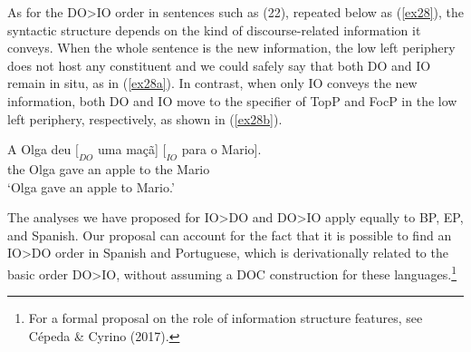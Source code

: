 \documentclass[output=paper,modfonts,nonflat]{langsci/langscibook}
\begin{document}

As for the DO>IO order in sentences such as (22), repeated below as (\ref{ex28}), the syntactic structure depends on the kind of discourse-related information it conveys. When the whole sentence is the new information, the low left periphery does not host any constituent and we could safely say that both DO and IO remain in situ, as in (\ref{ex28a}). In contrast, when only IO conveys the new information, both DO and IO move to the specifier of TopP and FocP in the low left periphery, respectively, as shown in (\ref{ex28b}).

\ea \label{ex28}
	\gll A   Olga deu $[_{DO}$ uma maçã] $[_{IO}$ para o   Mario].\\
			the Olga gave \hspaceThis{$[_{DO}$} an apple \hspaceThis{$[_{IO}$} to the Mario\\
	\glt ‘Olga gave an apple to Mario.’
		\label{ex28a}
		\label{ex28b}
	\z
\z

The analyses we have proposed for IO>DO and DO>IO apply equally to BP, EP, and Spanish. Our proposal can account for the fact that it is possible to find an IO>DO order in Spanish and Portuguese, which is derivationally related to the basic order DO>IO, without assuming a DOC construction for these languages.\footnote{For a formal proposal on the role of information structure features, see Cépeda \& Cyrino (2017).}
\end{document}
